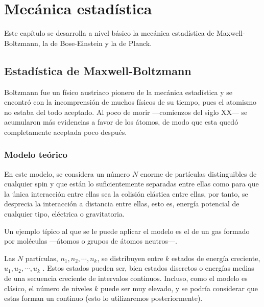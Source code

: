 %

\chapter{Mecánica estadística}
Este capítulo se desarrolla a nivel básico la mecánica estadística
de Maxwell-Boltzmann, la de Bose-Einstein y la de Planck.

\section{Estadística de Maxwell-Boltzmann}
Boltzmann fue un físico austriaco pionero de la mecánica estadística y se
encontró con la incomprensión de muchos físicos de su tiempo, pues el
atomismo no estaba del todo aceptado. Al poco de morir ---comienzos del siglo
XX--- se acumularon más evidencias a favor de los átomos, de modo que esta
quedó completamente aceptada poco después.

\subsection{Modelo teórico}
En este modelo, se considera un número $N$ enorme de partículas distinguibles
de cualquier spin y que están lo suficientemente separadas entre ellas como
para que la única interacción entre ellas sea la colisión elástica entre ellas,
por tanto, se desprecia la interacción a distancia entre ellas, esto es,
energía potencial de cualquier tipo, eléctrica o gravitatoria.

Un ejemplo típico al que se le puede aplicar el modelo es el de un gas formado
por moléculas ---átomos o grupos de átomos neutros---.

Las $N$ partículas, $n_1, n_2, \cdots, n_k$, se distribuyen entre $k$ estados
de energía creciente,  $u_1, u_2, \cdots, u_k$ . Estos estados pueden ser,
bien estados discretos o energías medias de una secuencia creciente de
intervalos continuos. Incluso, como el modelo es clásico, el número de niveles
$k$ puede ser muy elevado, y se podría considerar que estas forman un
continuo (esto lo utilizaremos posteriormente).









